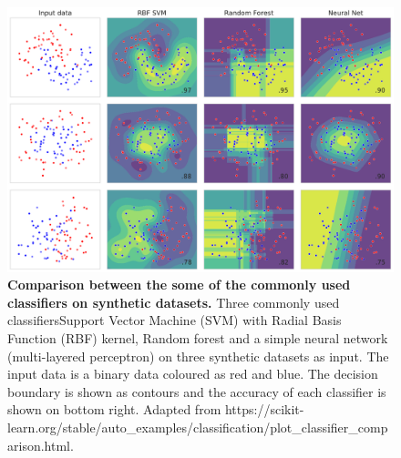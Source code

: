 \begin{figure}[!hbtp]
\centerline{\includegraphics[width=1\textwidth]{chapters/Introduction/Figures/classifier_comparision.pdf}}
\caption[Comparison between some of the commonly used classifiers on synthetic datasets..]{{\bf Comparison between the some of the commonly used classifiers on synthetic datasets.} Three commonly used classifiers\textemdash Support Vector Machine (SVM) with Radial Basis Function (RBF) kernel, Random forest and a simple neural network (multi-layered perceptron) on three synthetic datasets as input. The input data is a binary data coloured as red and blue. The decision boundary is shown as contours and the accuracy of each classifier is shown on bottom right. Adapted from https://scikit-learn.org/stable/auto\_examples/classification/plot\_classifier\_comparison.html.}\label{fig:classifier_comparision}
\end{figure}